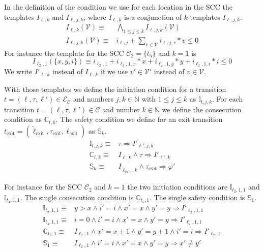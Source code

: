In the definition of the condition we use for each location in the SCC the templates $I_{\ell,k}$ and $I_{\ell,j,k}$, where $I_{\ell,k}$ is a conjunction of $k$ templates $I_{\ell,j,k}$.
\begin{align}
  I_{\ell,k}(\mathcal{V}) \equiv & \bigwedge_{1 \leq j \leq k}{I_{\ell,j,k}(\mathcal{V})}\\
  I_{\ell,j,k}(\mathcal{V}) \equiv & i_{\ell,j} + \sum_{v \in \mathcal{V}}{i_{\ell,j,v} * v} \leq 0
\end{align}
For instance the template for the SCC $\mathcal{C}_2 = \lbrace t_5 \rbrace$ and $k=1$ is \[ I_{\ell_2,1}(\lbrace x, y, i \rbrace) \equiv i_{\ell_2,1} + i_{\ell_2,1,x} * x + i_{\ell_2,1,y} * y + i_{\ell_2,1,i} * i \leq 0 \]
We write $I'_{\ell,k}$ instead of $I_{\ell,k}$ if we use $v' \in \mathcal{V}'$ instead of $v \in \mathcal{V}$.

With those templates we define the initiation condition for a transition $t = (\ell, \tau, \ell') \in \mathcal{E}_\mathcal{C}$ and numbers $j, k \in \mathbb{N}$ with $1 \leq j \leq k$ as $\mathbb{I}_{t,j,k}$.
For each transition $t = (\ell, \tau, \ell') \in \mathcal{C}$ and number $k \in \mathbb{N}$ we define the consecution condition as $\mathbb{C}_{t,k}$.
The safety condition we define for an exit transition $t_\text{exit} = (\tilde{\ell}_\text{exit}, \tau_\text{exit}, \ell_\text{exit})$ as $\mathbb{S}_k$.
\begin{align}
  \mathbb{I}_{t,j,k} \equiv & \tau \Rightarrow I'_{\ell',j,k}\\
  \mathbb{C}_{t,k} \equiv & I_{\ell,k} \wedge \tau \Rightarrow I'_{\ell',k}\\
  \mathbb{S}_k \equiv & I_{\tilde{\ell}_\text{exit},k} \wedge \tau_\text{exit} \Rightarrow \varphi'
\end{align}

For instance for the SCC $\mathcal{C}_2$ and $k=1$ the two initiation conditions are $\mathbb{I}_{t_2, 1, 1}$ and $\mathbb{I}_{t_4, 1, 1}$.
The single consecution condition is $\mathbb{C}_{t_5, 1}$.
The single safety condition is $\mathbb{S}_1$.
\begin{align}
  \mathbb{I}_{t_2, 1, 1} \equiv & y > x \wedge i' = i \wedge x' = x \wedge y' = y \Rightarrow I'_{\ell_2,1,1}\\
  \mathbb{I}_{t_4, 1, 1} \equiv & i = 0 \wedge i' = i \wedge x' = x \wedge y' = y \Rightarrow I'_{\ell_2,1,1}\\
  \mathbb{C}_{t_5, 1} \equiv & I_{\ell_2,1} \wedge x' = x + 1 \wedge y' = y + 1 \wedge i' = i \Rightarrow I'_{\ell_2,1}\\
  \mathbb{S}_1 \equiv & I_{\ell_2,1} \wedge i' = i \wedge x' = x \wedge y' = y \Rightarrow x' \neq y'
\end{align}
  
